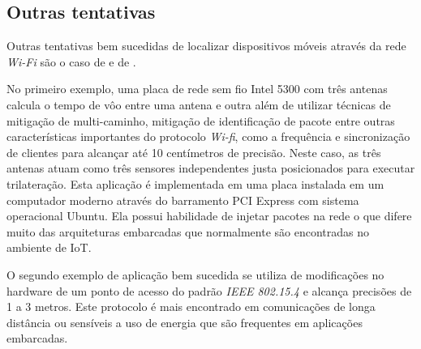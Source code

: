 \subsection{Outras tentativas}
\label{subsec:Outras tentativas}

Outras tentativas bem sucedidas de localizar dispositivos móveis através da rede
\emph{Wi-Fi} são o caso de  e de .

No primeiro exemplo, uma placa de rede sem fio Intel 5300 com três antenas calcula o tempo
de vôo entre uma antena e outra além de utilizar técnicas de mitigação de
multi-caminho, mitigação de identificação de pacote entre outras características
importantes do protocolo \emph{Wi-fi}, como a frequência e sincronização de clientes
para alcançar até 10 centímetros de precisão. Neste caso, as três antenas atuam
como três sensores independentes justa posicionados para executar trilateração.
Esta aplicação é implementada em uma placa instalada em um computador moderno
através do barramento PCI Express com sistema operacional Ubuntu. Ela possui habilidade
de injetar pacotes na rede o que difere muito das arquiteturas embarcadas que
normalmente são encontradas no ambiente de IoT.

O segundo exemplo de aplicação bem sucedida se utiliza de modificações no
hardware de um ponto de acesso do padrão \emph{IEEE 802.15.4} e alcança precisões de 1 a 3
metros. Este protocolo é mais encontrado em comunicações de longa distância ou
sensíveis a uso de energia que são frequentes em aplicações embarcadas.
